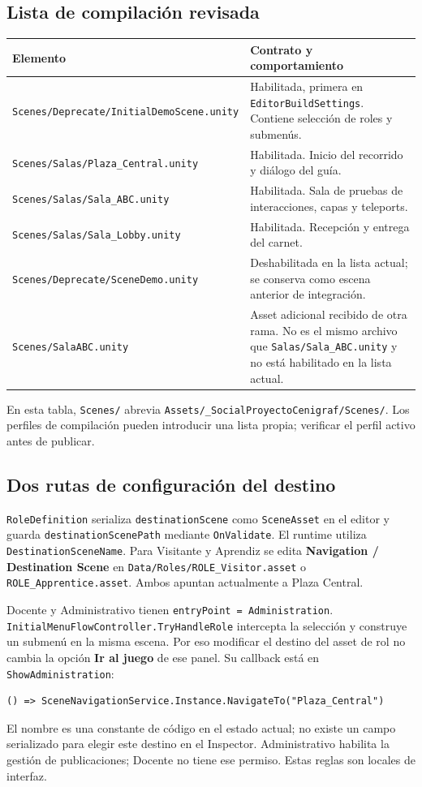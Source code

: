 \documentclass[11pt,letterpaper,oneside]{article}
\makeatletter
\newcommand{\code}[1]{\nolinkurl{#1}}
\newenvironment{spec}{\begingroup\small\begin{longtable}{@{}>{\raggedright\arraybackslash}p{0.32\textwidth}>{\raggedright\arraybackslash}p{0.64\textwidth}@{}}\toprule\textbf{Elemento} & \textbf{Contrato y comportamiento} \\ \midrule\endhead}{\bottomrule\end{longtable}\endgroup}
\makeatother
\begin{document}
\subsection{Lista de compilación revisada}
\begin{spec}
\code{Scenes/Deprecate/InitialDemoScene.unity} & Habilitada, primera en \code{EditorBuildSettings}. Contiene selección de roles y submenús. \\
\code{Scenes/Salas/Plaza_Central.unity} & Habilitada. Inicio del recorrido y diálogo del guía. \\
\code{Scenes/Salas/Sala_ABC.unity} & Habilitada. Sala de pruebas de interacciones, capas y teleports. \\
\code{Scenes/Salas/Sala_Lobby.unity} & Habilitada. Recepción y entrega del carnet. \\
\code{Scenes/Deprecate/SceneDemo.unity} & Deshabilitada en la lista actual; se conserva como escena anterior de integración. \\
\code{Scenes/SalaABC.unity} & Asset adicional recibido de otra rama. No es el mismo archivo que \code{Salas/Sala_ABC.unity} y no está habilitado en la lista actual. \\
\end{spec}
En esta tabla, \code{Scenes/} abrevia \code{Assets/_SocialProyectoCenigraf/Scenes/}. Los perfiles de compilación pueden introducir una lista propia; verificar el perfil activo antes de publicar.

\subsection{Dos rutas de configuración del destino}
\code{RoleDefinition} serializa \code{destinationScene} como \code{SceneAsset} en el editor y guarda \code{destinationScenePath} mediante \code{OnValidate}. El runtime utiliza \code{DestinationSceneName}. Para Visitante y Aprendiz se edita \textbf{Navigation / Destination Scene} en \code{Data/Roles/ROLE_Visitor.asset} o \code{ROLE_Apprentice.asset}. Ambos apuntan actualmente a Plaza Central.

Docente y Administrativo tienen \code{entryPoint = Administration}. \code{InitialMenuFlowController.TryHandleRole} intercepta la selección y construye un submenú en la misma escena. Por eso modificar el destino del asset de rol no cambia la opción \textbf{Ir al juego} de ese panel. Su callback está en \code{ShowAdministration}:
\begin{lstlisting}
() => SceneNavigationService.Instance.NavigateTo("Plaza_Central")
\end{lstlisting}
El nombre es una constante de código en el estado actual; no existe un campo serializado para elegir este destino en el Inspector. Administrativo habilita la gestión de publicaciones; Docente no tiene ese permiso. Estas reglas son locales de interfaz.
\end{document}
